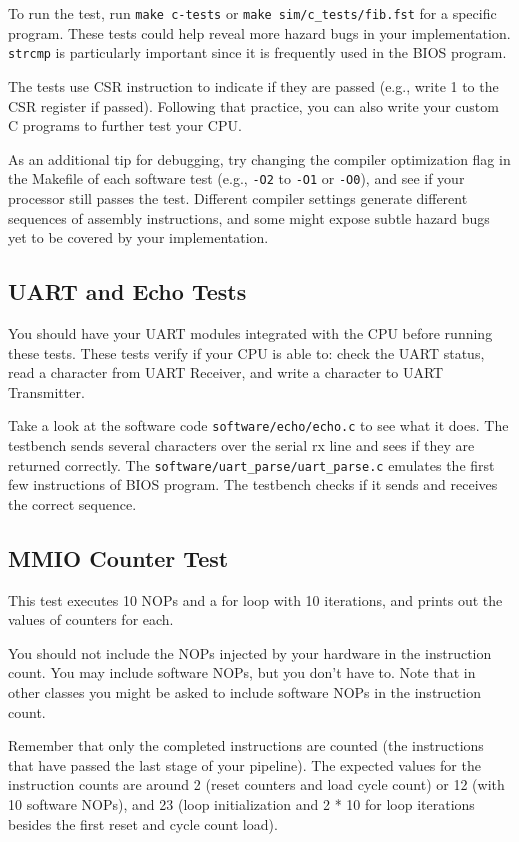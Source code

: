 To run the test, run \verb|make c-tests| or \verb|make sim/c_tests/fib.fst| for a specific program.
These tests could help reveal more hazard bugs in your implementation.
\verb|strcmp| is particularly important since it is frequently used in the BIOS program.

The tests use CSR instruction to indicate if they are passed
(e.g., write 1 to the CSR register if passed).
Following that practice, you can also write your custom C programs to further test your CPU.

As an additional tip for debugging, try changing the compiler optimization flag in the Makefile
of each software test (e.g., \verb|-O2| to \verb|-O1| or \verb|-O0|),
and see if your processor still passes the test.
Different compiler settings generate different sequences of assembly instructions,
and some might expose subtle hazard bugs yet to be covered by your implementation.

\subsection{UART and Echo Tests}
You should have your UART modules integrated with the CPU before running these tests.
These tests verify if your CPU is able to: check the UART status,
read a character from UART Receiver, and write a character to UART Transmitter.

Take a look at the software code \verb|software/echo/echo.c| to see what it does.
The testbench sends several characters over the serial rx line and sees if they are returned correctly.
The \verb|software/uart_parse/uart_parse.c| emulates the first few instructions of BIOS program.
The testbench checks if it sends and receives the correct sequence.

\subsection{MMIO Counter Test}
This test executes 10 NOPs and a for loop with 10 iterations,
and prints out the values of counters for each.

You should not include the NOPs injected by your hardware in the instruction count.
You may include software NOPs, but you don't have to.
Note that in other classes you might be asked to include software NOPs in the instruction count.

Remember that only the completed instructions are counted
(the instructions that have passed the last stage of your pipeline).
The expected values for the instruction counts are around
2 (reset counters and load cycle count) or 12 (with 10 software NOPs),
and 23 (loop initialization and 2 * 10 for loop iterations besides the first reset and cycle count load).

